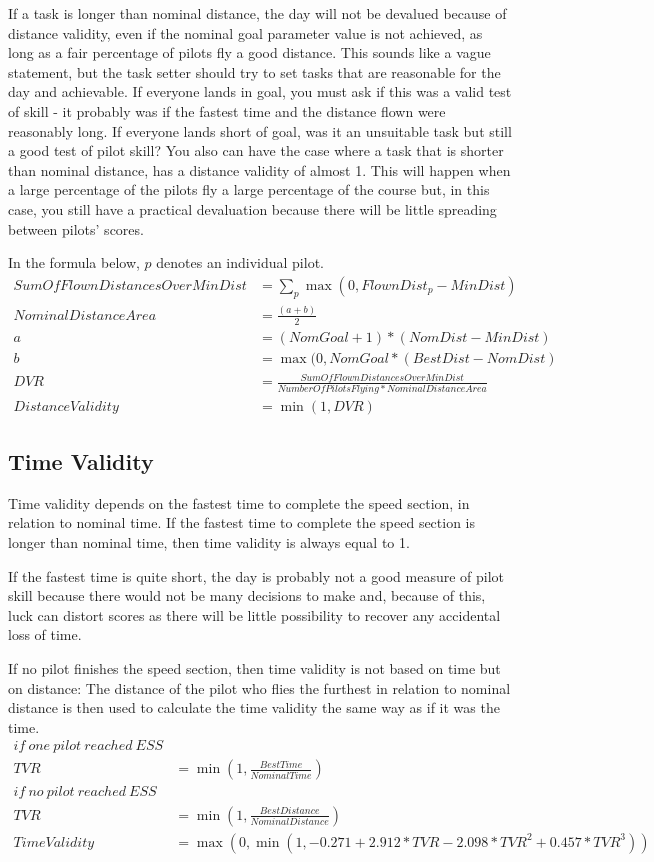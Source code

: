 \documentclass{article}
\begin{document}
If a task is longer than nominal distance, the day will not be devalued because of distance validity, even
if the nominal goal parameter value is not achieved, as long as a fair percentage of pilots fly a good
distance. This sounds like a vague statement, but the task setter should try to set tasks that are
reasonable for the day and achievable. If everyone lands in goal, you must ask if this was a valid test of
skill - it probably was if the fastest time and the distance flown were reasonably long. If everyone lands
short of goal, was it an unsuitable task but still a good test of pilot skill? You also can have the case
where a task that is shorter than nominal distance, has a distance validity of almost 1. This will happen
when a large percentage of the pilots fly a large percentage of the course but, in this case, you still have
a practical devaluation because there will be little spreading between pilots’ scores.

In the formula below, \(p\) denotes an individual pilot.
\begin{align*}
    SumOfFlownDistancesOverMinDist &= \sum_p \max(0, FlownDist_p - MinDist) \\
    NominalDistanceArea &= \frac{(a + b)}{2} \\
    a &= (NomGoal + 1) * (NomDist - MinDist) \\
    b &= \max(0, NomGoal * (BestDist - NomDist) \\
    DVR &= \frac{SumOfFlownDistancesOverMinDist}{NumberOfPilotsFlying * NominalDistanceArea} \\
    DistanceValidity &= \min(1, DVR)
\end{align*}

\subsection{Time Validity}
Time validity depends on the fastest time to complete the speed section, in relation to nominal time. If
the fastest time to complete the speed section is longer than nominal time, then time validity is always
equal to 1.

If the fastest time is quite short, the day is probably not a good measure of pilot skill because there
would not be many decisions to make and, because of this, luck can distort scores as there will be little
possibility to recover any accidental loss of time.

If no pilot finishes the speed section, then time validity is not based on time but on distance: The
distance of the pilot who flies the furthest in relation to nominal distance is then used to calculate the
time validity the same way as if it was the time.
\begin{align*}
    if \ one \ pilot \ reached \ ESS \\
    TVR &= \min(1, \frac{BestTime}{NominalTime}) \\
    if \ no \ pilot \ reached \ ESS \\
    TVR &= \min(1, \frac{BestDistance}{NominalDistance}) \\
    TimeValidity &= \max(0, \min(1, -0.271 + 2.912 * TVR - 2.098 * TVR^2 + 0.457 * TVR^3))
\end{align*}
\end{document}
